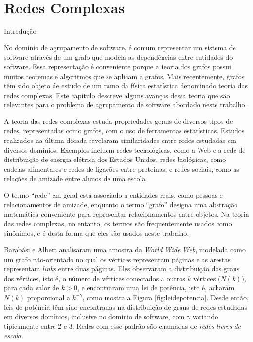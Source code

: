 
\chapter{Redes Complexas} \label{cap:redes}

\begin{section}{Introdução} \label{sec:redes-complexas}

No domínio de agrupamento de software, é comum representar um sistema de software através de um grafo que modela as dependências entre entidades do software. Essa representação é conveniente porque a teoria dos grafos possui muitos teoremas e algoritmos que se aplicam a grafos. Mais recentemente, grafos têm sido objeto de estudo de um ramo da física estatística denominado teoria das redes complexas. Este capítulo descreve alguns avanços dessa teoria que são relevantes para o problema de agrupamento de software abordado neste trabalho.

A teoria das redes complexas estuda propriedades gerais de diversos tipos de redes, representadas como grafos, com o uso de ferramentas estatísticas. Estudos realizados na última década revelaram similaridades entre redes estudadas em diversos domínios. Exemplos incluem redes tecnológicas, como a Web e a rede de distribuição de energia elétrica dos Estados Unidos, redes biológicas, como cadeias alimentares e redes de ligações entre proteínas, e redes sociais, como as relações de amizade entre alunos de uma escola.

O termo ``rede'' em geral está associado a entidades reais, como pessoas e relacionamentos de amizade, enquanto o termo ``grafo'' designa uma abstração matemática conveniente para representar relacionamentos entre objetos. Na teoria das redes complexas, no entanto, os termos são frequentemente usados como sinônimos, e é desta forma que eles são usados neste trabalho.

Barabási e Albert \cite{Barabasi1999} analisaram uma amostra da \emph{World Wide Web}, modelada como um grafo não-orientado no qual os vértices representam páginas e as arestas representam \emph{links} entre duas páginas. Eles observaram a distribuição dos graus dos vértices, isto é, o número de vértices conectados a outros $k$ vértices ($N(k)$), para cada valor de $k > 0$, e encontraram uma lei de potência, isto é, acharam $N(k)$ proporcional a $k^{-\gamma}$, como mostra a Figura \ref{fig:leidepotencia}. Desde então, leis de potência têm sido encontradas na distribuição de graus de redes estudadas em diversos domínios, inclusive no domínio de software, com $\gamma$ variando tipicamente entre 2 e 3. Redes com esse padrão são chamadas de \emph{redes livres de escala}.


\end{section}
